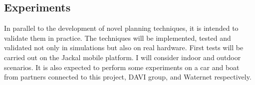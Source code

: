 \subsection{Experiments}

In parallel to the development of novel planning techniques, it is intended to validate them in practice. The techniques will be implemented, tested and validated not only in simulations but also on real hardware. First tests will be carried out on the Jackal mobile platform. I will consider indoor and outdoor scenarios. It is also expected to perform some experiments on a car and boat from partners connected to this project, DAVI group, and Waternet respectively.